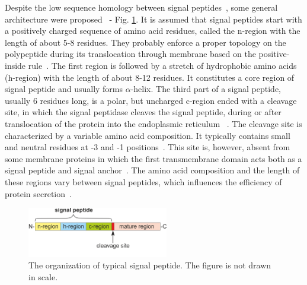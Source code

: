 \documentclass[fleqn,10pt,twoside]{gcb15submission}
\begin{document}
Despite the low sequence homology between signal peptides~\citep{1999ladungaphysean}, some general architecture were proposed~\citep{1994izardsignal, 2013vossmechanism} - Fig. \ref{fig:sparch}. It is assumed that signal peptides start with a positively charged sequence of amino acid residues, called the n-region with the length of about 5-8 residues. They probably enforce a proper topology on the polypeptide during its translocation through membrane based on the positive-inside rule~\citep{1988vonheijnetopogenic}. The first region is followed by a stretch of hydrophobic amino acids (h-region) with the length of about 8-12 residues. It constitutes a core region of signal peptide and usually forms $\alpha$-helix. The third part of a signal peptide, usually 6 residues long, is a polar, but uncharged c-region ended with a cleavage site, in which the signal peptidase cleaves the signal peptide, during or after translocation of the protein into the endoplasmic reticulum ~\citep{2002paetzelsignal}. The cleavage site is characterized by a variable amino acid composition. It typically contains small and neutral residues at -3 and -1 positions~\citep{1994palzkillselection}. This site is, however, absent from some membrane proteins in which the first transmembrane domain acts both as a signal peptide and signal anchor~\citep{1988szczesnaskorupapositive}. The amino acid composition and the length of these regions vary between signal peptides, which influences the efficiency of protein secretion~\citep{2006hegdethe}.

\begin{figure}[ht]\centering
\includegraphics[width=0.55\textwidth]{figures/SP.png}
\caption{The organization of typical signal peptide. The figure is not drawn in scale.}
\label{fig:sparch}
\end{figure}
\end{document}
